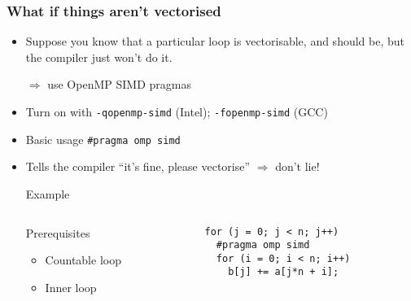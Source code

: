 \documentclass[presentation,aspectratio=43,10pt]{beamer}
\begin{document}
\begin{frame}[fragile]
  \frametitle{What if things aren't vectorised}
  \begin{itemize}
  \item Suppose you know that a particular loop is vectorisable, and
    should be, but the compiler just won't do it.
  \item[$\Rightarrow$] use OpenMP SIMD pragmas
  \item Turn on with \texttt{-qopenmp-simd} (Intel);
    \texttt{-fopenmp-simd} (GCC)
  \item Basic usage \texttt{\#pragma omp simd}
  \item Tells the compiler ``it's fine, please vectorise''
    $\Rightarrow$ don't lie!
    \begin{challenge}{Example}
      \begin{columns}
        \begin{column}{0.45\textwidth}
          Prerequisites
          \begin{itemize}
          \item Countable loop
          \item Inner loop
          \end{itemize}
        \end{column}
        \begin{column}{0.45\textwidth}
\begin{verbatim}
for (j = 0; j < n; j++)
  #pragma omp simd
  for (i = 0; i < n; i++)
    b[j] += a[j*n + i];
\end{verbatim}
        \end{column}
      \end{columns}
    \end{challenge}
  \end{itemize}
\end{frame}
\end{document}
